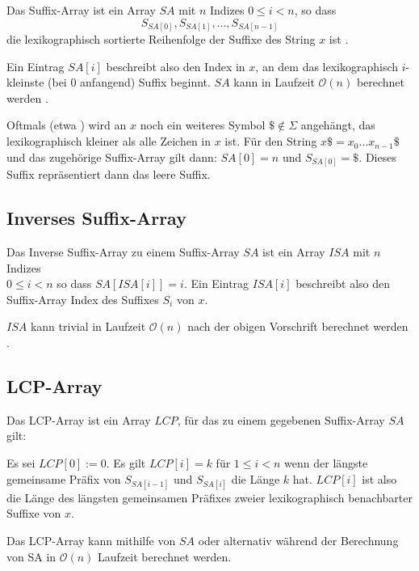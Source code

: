 Das Suffix-Array ist ein Array $SA$ mit $n$ Indizes $0 \leq i < n$, so dass 
\begin{equation*}
	S_{SA[0]}, S_{SA[1]}, \dots, S_{SA[n-1]}
\end{equation*}
die lexikographisch sortierte Reihenfolge der Suffixe des String $x$ ist \cite{abouelhoda_replacing_2004, manber_suffix_1993}.

Ein Eintrag $SA[i]$ beschreibt also den Index in $x$, an dem das lexikographisch $i$-kleinste (bei $0$ anfangend) Suffix beginnt. $SA$ kann in Laufzeit $\mathcal{O}(n)$ berechnet werden \cite{nong_two_2011}. 

Oftmals (etwa \cite{fischer_inducing_2011, nong_two_2011}) wird an $x$ noch ein weiteres Symbol $\$ \notin \Sigma$ angehängt, das lexikographisch kleiner als alle Zeichen in $x$ ist. Für den String $x\$ = x_0\dots x_{n-1} \$$ und das zugehörige Suffix-Array gilt dann: $SA[0] = n$ und $S_{SA[0]} = \$$. Dieses Suffix repräsentiert dann das leere Suffix.

\subsection{Inverses Suffix-Array}

Das Inverse Suffix-Array zu einem Suffix-Array $SA$ ist ein Array $ISA$ mit $n$ Indizes \\
$0 \leq i < n$ so dass $SA[ISA[i]] = i$.
Ein Eintrag $ISA[i]$ beschreibt also den Suffix-Array Index des Suffixes $S_i$ von $x$.

$ISA$ kann trivial in Laufzeit $\mathcal{O}(n)$ nach der obigen Vorschrift berechnet werden \cite{abouelhoda_replacing_2004}.

\subsection{LCP-Array}

Das LCP-Array ist ein Array $LCP$, für das zu einem gegebenen Suffix-Array $SA$ gilt: 

Es sei $LCP[0] := 0$. Es gilt $LCP[i] = k$ für $1 \leq i < n$ wenn der längste gemeinsame Präfix von $S_{SA[i-1]}$ und $S_{SA[i]}$ die Länge $k$ hat. $LCP[i]$ ist also die Länge des längsten gemeinsamen Präfixes zweier lexikographisch benachbarter Suffixe von $x$. 

Das LCP-Array kann mithilfe von $SA$ \cite{kasai_linear-time_2001} oder alternativ während der Berechnung von SA \cite{fischer_inducing_2011} in $\mathcal{O}(n)$ Laufzeit berechnet werden.